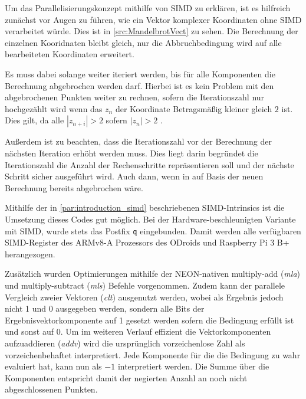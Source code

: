 Um das Parallelisierungskonzept mithilfe von SIMD zu erklären,
ist es hilfreich zunächst vor Augen zu führen, wie ein Vektor komplexer Koordinaten ohne SIMD verarbeitet würde.
Dies ist in \autoref{src:MandelbrotVect} zu sehen.
Die Berechnung der einzelnen Kooridnaten bleibt gleich, nur die Abbruchbedingung wird auf alle bearbeiteten Koordinaten erweitert.

Es muss dabei solange weiter iteriert werden, bis für alle Komponenten die Berechnung abgebrochen werden darf.
Hierbei ist es kein Problem mit den abgebrochenen Punkten weiter zu rechnen, sofern die
Iterationszahl nur hochgezählt wird wenn das $z_n$ der Koordinate Betragsmäßig kleiner gleich $2$ ist.
Dies gilt, da alle $|z_{n+i}| > 2$ sofern $|z_n| > 2$ \cite{424331}.

Außerdem ist zu beachten, dass die Iterationszahl vor der Berechnung der nächsten Iteration erhöht werden muss.
Dies liegt darin begründet die Iterationszahl die Anzahl der Rechenschritte repräsentieren soll und
der nächste Schritt sicher ausgeführt wird. Auch dann, wenn in auf Basis der neuen Berechnung bereits abgebrochen wäre.

\begin{figure}[h!]
	
\end{figure}

Mithilfe der in \autoref{par:introduction_simd} beschriebenen SIMD-Intrinsics ist die Umsetzung dieses Codes gut möglich.
Bei der Hardware-beschleunigten Variante mit SIMD, wurde stets das Postfix \verb|q| eingebunden.
Damit werden alle verfügbaren SIMD-Register des ARMv8-A Prozessors des ODroids und Raspberry Pi 3 B+ herangezogen.

Zusätzlich wurden Optimierungen mithilfe der NEON-nativen multiply-add (\textit{mla}) und multiply-subtract (\textit{mls}) Befehle vorgenommen.
Zudem kann der parallele Vergleich zweier Vektoren (\textit{clt}) ausgenutzt werden, wobei als Ergebnis jedoch nicht 1 und 0 ausgegeben werden,
sondern alle Bits der Ergebnisvektorkomponente auf 1 gesetzt werden sofern die Bedingung erfüllt ist und sonst auf 0.
Um im weiteren Verlauf effizient die Vektorkomponenten aufzuaddieren (\textit{addv}) wird die ursprünglich vorzeichenlose Zahl als vorzeichenbehaftet interpretiert.
Jede Komponente für die die Bedingung zu wahr evaluiert hat, kann nun als $-1$ interpretiert werden.
Die Summe über die Komponenten entspricht damit der negierten Anzahl an noch nicht abgeschlossenen Punkten.  

